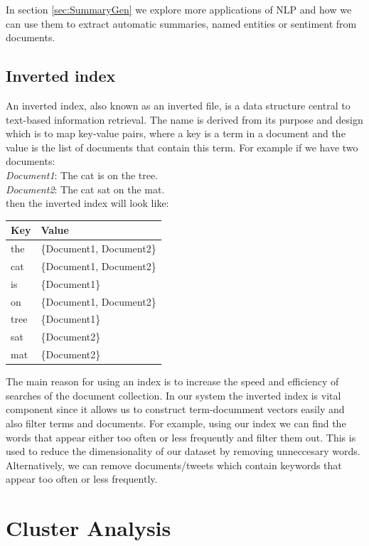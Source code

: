 In section \ref{sec:SummaryGen} we explore more applications of NLP and how we can use them to extract automatic summaries, named entities or sentiment from documents.

\subsection{Inverted index}
An inverted index, also known as an inverted file, is a data structure central to text-based information retrieval. The name is derived from its 
purpose and design which is to map key-value pairs, where a key is a term in a document and the value is the list of documents that contain this term.
For example if we have two documents:\\
\emph{Document1}: The cat is on the tree. \\
\emph{Document2}: The cat sat on the mat. \\
then the inverted index will look like:

\begin{center}
\begin{tabular}{ |l | l| }
  \hline
  \textbf{Key} & \textbf{Value} \\ \hline
  the & \{Document1, Document2\} \\
  cat & \{Document1, Document2\} \\
  is & \{Document1\} \\
  on & \{Document1, Document2\} \\
  tree & \{Document1\} \\
  sat & \{Document2\} \\
  mat & \{Document2\} \\
  \hline
\end{tabular}
\end{center}

The main reason for using an index is to increase the speed and efficiency of searches of the document 
collection. In our system the inverted index is vital component since it allows us to construct
term-documment vectors easily and also filter terms and documents. For example, using our index we
can find the words that appear either too often or less frequently and filter them out. This is used
to reduce the dimensionality of our dataset by removing unneccesary words. Alternatively, we
can remove documents/tweets which contain keywords that appear too often or less frequently.

\section{Cluster Analysis}

